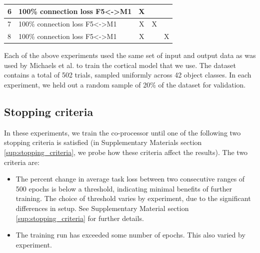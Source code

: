 \documentclass[12pt]{iopart}
\begin{document}
\begin{table}[h]
\begin{tabular}{|l|l|c|c|c|}
6              & 100\% connection loss F5\textless{}-\textgreater{}M1 & X                                                                                               &                                                                                                &                                                                                                 \\ \hline
7              & 100\% connection loss F5\textless{}-\textgreater{}M1 & X                                                                                               & X                                                                                              &                                                                                                 \\ \hline
8              & 100\% connection loss F5\textless{}-\textgreater{}M1 & X                                                                                               &                                                                                                & X                                                                                               \\ \hline
\end{tabular}
\end{table}

Each of the above experiments used the same set of input and output data as was used by
Michaels et al. \cite{michaels.mrnn} to train the cortical model that we use. The dataset
contains a total of 502 trials, sampled uniformly across 42 object classes. In each experiment,
we held out a random sample of 20\% of the dataset for validation.

\subsection{Stopping criteria}
In these experiments, we train the co-processor until one of the following two stopping criteria is
satisfied (in Supplementary Materials section \ref{sup:stopping_criteria}, we probe how these criteria
affect the results). The two criteria are:

\begin{itemize}
	\item The percent change in average task loss between two consecutive ranges of 500 epochs
	      is below a threshold, indicating minimal benefits of further training. The choice of
        threshold varies by experiment, due to the significant differences in setup. See Supplementary
        Material section \ref{sup:stopping_criteria} for further details.
	\item The training run has exceeded some number of epochs. This also varied by experiment.
\end{itemize}
\end{document}
